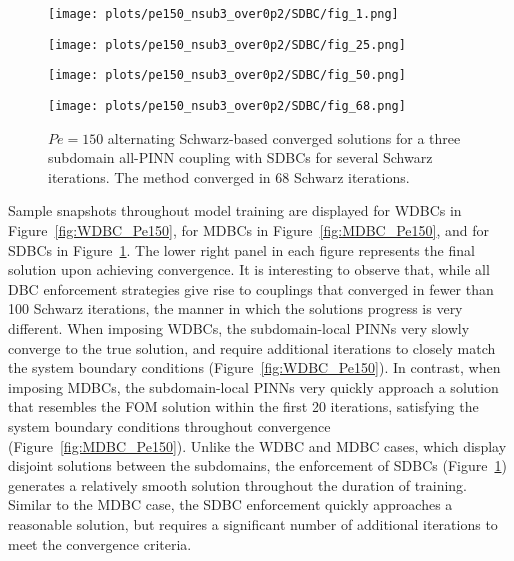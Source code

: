 \documentclass[oneside,final]{csri23}
\begin{document}
\begin{figure}
    \begin{minipage}{0.49\linewidth}
        \texttt{[image: plots/pe150\_nsub3\_over0p2/SDBC/fig\_1.png]}
    \end{minipage}
    \begin{minipage}{0.49\linewidth}
        \texttt{[image: plots/pe150\_nsub3\_over0p2/SDBC/fig\_25.png]}
    \end{minipage}
    
    \begin{minipage}{0.49\linewidth}
        \texttt{[image: plots/pe150\_nsub3\_over0p2/SDBC/fig\_50.png]}
    \end{minipage}
    \begin{minipage}{0.49\linewidth}
        \texttt{[image: plots/pe150\_nsub3\_over0p2/SDBC/fig\_68.png]}
    \end{minipage}
    \caption{$Pe = 150$ alternating Schwarz-based converged solutions for a three subdomain all-PINN coupling with SDBCs for several Schwarz iterations.  The method converged in 68 Schwarz iterations.}
    \label{fig:SDBC_Pe150}
\end{figure}

Sample snapshots throughout model training are displayed for WDBCs in Figure~\ref{fig:WDBC_Pe150}, for MDBCs in Figure~\ref{fig:MDBC_Pe150}, and for SDBCs in Figure~\ref{fig:SDBC_Pe150}. The lower right panel in each figure represents the final solution upon achieving convergence. It is interesting to observe that, while all DBC enforcement strategies give rise to couplings that converged in fewer than 100 Schwarz iterations, the manner in which the solutions progress is very different. When imposing WDBCs, the subdomain-local PINNs very slowly converge to the true solution, and require additional iterations to closely match the system boundary conditions (Figure~\ref{fig:WDBC_Pe150}). In contrast, when imposing MDBCs, the subdomain-local PINNs very quickly approach a solution that resembles the FOM solution within the first 20 iterations, satisfying the system boundary conditions throughout convergence (Figure~\ref{fig:MDBC_Pe150}). Unlike the WDBC and MDBC cases, which display disjoint solutions between the subdomains, the enforcement of SDBCs (Figure~\ref{fig:SDBC_Pe150}) generates a relatively smooth solution throughout the duration of training. Similar to the MDBC case, the SDBC enforcement quickly approaches a reasonable solution, but requires a significant number of additional iterations to meet the convergence criteria.
\end{document}
